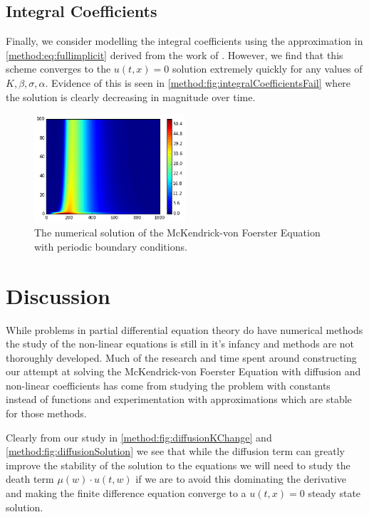 \documentclass[../main.tex]{subfiles}
\begin{document}
  \subsection{Integral Coefficients}
  Finally, we consider modelling the integral coefficients using the approximation in \autoref{method:eq:fullimplicit} derived from the work of \cite{hartvig2011}. However, we find that this scheme converges to the $u(t, x) = 0$ solution extremely quickly for any values of $K, \beta, \sigma, \alpha$. Evidence of this is seen in \autoref{method:fig:integralCoefficientsFail} where the solution is clearly decreasing in magnitude over time.

  \begin{figure}[htb]
    \centering
    \includegraphics[width=0.5\textwidth]{_assets/integralCoeffsFail.png}
    \caption{\label{method:fig:integralCoefficientsFail} The numerical solution of the McKendrick-von Foerster Equation with periodic boundary conditions.}
  \end{figure}

  \section{Discussion}

  While problems in partial differential equation theory do have numerical methods the study of the non-linear equations is still in it's infancy and methods are not thoroughly developed. Much of the research and time spent around constructing our attempt at solving the McKendrick-von Foerster Equation with diffusion and non-linear coefficients has come from studying the problem with constants instead of functions and experimentation with approximations which are stable for those methods.

  Clearly from our study in \autoref{method:fig:diffusionKChange} and \autoref{method:fig:diffusionSolution} we see that while the diffusion term can greatly improve the stability of the solution to the equations we will need to study the death term $\mu(w) \cdot u(t, w)$ if we are to avoid this dominating the derivative and making the finite difference equation converge to a $u(t, x) = 0$ steady state solution. 
\end{document}
